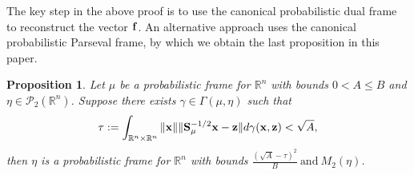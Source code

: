 \documentclass{amsart}
\numberwithin{equation}{section}
\theoremstyle{plain}
\newtheorem{proposition}[theorem]{Proposition}
\theoremstyle{definition}
\begin{document}
The key step in the above proof is to use the canonical probabilistic dual frame to reconstruct the vector ${\bf f}$. An alternative approach uses the canonical probabilistic Parseval frame, by which we obtain the last proposition in this paper. 
\begin{proposition}\label{ParsevelConstructionPerturbation}
Let $\mu$ be a probabilistic frame for $\mathbb{R}^n$ with bounds $0<A \leq B$ and $\eta \in \mathcal{P}_2(\mathbb{R}^n)$. Suppose there exists $\gamma \in \Gamma(\mu, \eta)$ such that 
\begin{equation*}
   \tau:= \int_{\mathbb{R}^n  \times \mathbb{R}^n} \Vert {\bf x} \Vert \Vert  {\bf S}_\mu^{-1/2} {\bf x}- {\bf z}  \Vert d \gamma({\bf x}, {\bf z}) < \sqrt{A},
\end{equation*}
then $\eta$ is a probabilistic frame for $\mathbb{R}^n$  with bounds $  \frac{(\sqrt{A}- \tau)^2}{B} \ \text{and} \ M_2(\eta)$.
\end{proposition}
\end{document}

